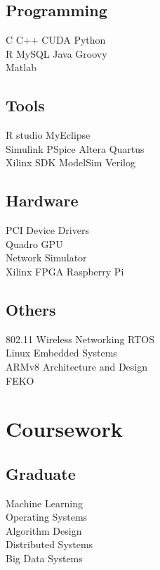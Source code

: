 \documentclass[letterpaper]{deedy-resume} %
\begin{document}
\begin{minipage}[t]{0.23\textwidth}
\subsection{Programming}
\footnotesize{C \textbullet{} C++ \textbullet{} CUDA \textbullet{} 
Python \\ R \textbullet{} MySQL \textbullet{} Java Groovy\\
Matlab \textbullet{}}
\vspace{1 mm}
\subsection{Tools}
R studio \textbullet{} MyEclipse\\
Simulink \textbullet{} PSpice \textbullet{}
Altera Quartus \\ Xilinx SDK \textbullet{}
ModelSim \textbullet{} Verilog\\

\vspace{-1 mm}
\subsection{Hardware}
PCI Device Drivers \\
Quadro GPU \\
Network Simulator \\
Xilinx FPGA \textbullet{} Raspberry Pi\\
\vspace{-1 mm}
\subsection{Others}
802.11 Wireless Networking \textbullet{} RTOS \\Linux 
\textbullet{} Embedded Systems
\\ ARMv8 Architecture and Design \textbullet{}\\
 \textbullet{} FEKO\\


\vspace{-5 mm}
\section{Coursework}
\subsection{Graduate}
\textbullet{} Machine Learning \\
\textbullet{} Operating Systems \\
\textbullet{} Algorithm Design \\
\textbullet{} Distributed Systems \\
\textbullet{} Big Data Systems \\


\end{minipage}
\end{document}
